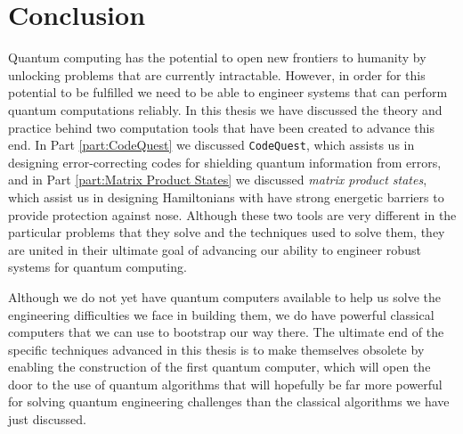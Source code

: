 \documentclass[12pt]{amsbook}
\theoremstyle{plain}
\theoremstyle{definition}
\theoremstyle{remark}
\begin{document}
\part{Conclusion}
\label{part:Conclusions}

Quantum computing has the potential to open new frontiers to humanity by unlocking problems that are currently intractable.  However, in order for this potential to be fulfilled we need to be able to engineer systems that can perform quantum computations reliably.  In this thesis we have discussed the theory and practice behind two computation tools that have been created to advance this end.  In Part \ref{part:CodeQuest} we discussed \texttt{CodeQuest}, which assists us in designing error-correcting codes for shielding quantum information from errors, and in Part \ref{part:Matrix Product States} we discussed \emph{matrix product states}, which assist us in designing Hamiltonians with have strong energetic barriers to provide protection against nose.  Although these two tools are very different in the particular problems that they solve and the techniques used to solve them, they are united in their ultimate goal of advancing our ability to engineer robust systems for quantum computing.

Although we do not yet have quantum computers available to help us solve the engineering difficulties we face in building them, we do have powerful classical computers that we can use to bootstrap our way there.  The ultimate end of the specific techniques advanced in this thesis is to make themselves obsolete by enabling the construction of the first quantum computer, which will open the door to the use of quantum algorithms that will hopefully be far more powerful for solving quantum engineering challenges than the classical algorithms we have just discussed.


\end{document}
